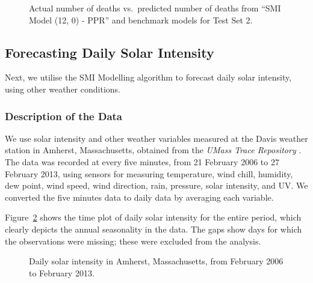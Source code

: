 \documentclass[
  11pt,
  a4paper,
]{article}
\begin{document}
\begin{figure}


\caption{\label{fig-heatPred}Actual number of deaths vs.~predicted
number of deaths from ``SMI Model (12, 0) - PPR'' and benchmark models
for Test Set 2.}

\end{figure}%

\pagebreak

\subsection{Forecasting Daily Solar Intensity}\label{sec-solar}

Next, we utilise the SMI Modelling algorithm to forecast daily solar
intensity, using other weather conditions.

\subsubsection{Description of the Data}\label{description-of-the-data-1}

We use solar intensity and other weather variables measured at the Davis
weather station in Amherst, Massachusetts, obtained from the \emph{UMass
Trace Repository} \autocite{Umass2023}. The data was recorded at every
five minutes, from 21 February 2006 to 27 February 2013, using sensors
for measuring temperature, wind chill, humidity, dew point, wind speed,
wind direction, rain, pressure, solar intensity, and UV. We converted
the five minutes data to daily data by averaging each variable.

Figure~\ref{fig-solar} shows the time plot of daily solar intensity for
the entire period, which clearly depicts the annual seasonality in the
data. The gaps show days for which the observations were missing; these
were excluded from the analysis.

\begin{figure}


\caption{\label{fig-solar}Daily solar intensity in Amherst,
Massachusetts, from February 2006 to February 2013.}

\end{figure}%
\end{document}
